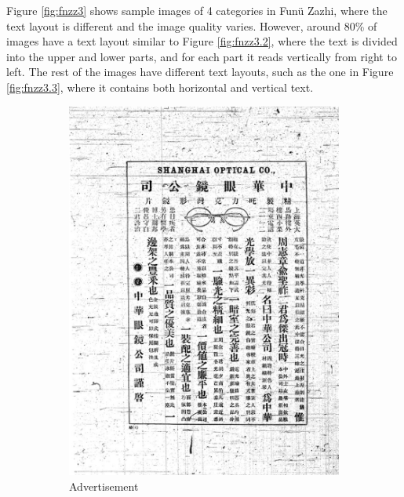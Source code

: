 \documentclass[12pt,twoside]{report}
\begin{document}
Figure \ref{fig:fnzz3} shows sample images of 4 categories in Funü Zazhi, where the text layout is different and the image quality varies. However, around 80\% of images have a text layout similar to Figure \ref{fig:fnzz3.2}, where the text is divided into the upper and lower parts, and for each part it reads vertically from right to left. The rest of the images have different text layouts, such as the one in Figure \ref{fig:fnzz3.3}, where it contains both horizontal and vertical text.

\begin{figure}[htbp]
    \centering
    \begin{subfigure}[b]{0.23\linewidth}
        \includegraphics[width=\linewidth]{./figures/fnzz3.1}
        \caption{Advertisement}
        \label{fig:fnzz3.1}
    \end{subfigure}
    \hfill
    \begin{subfigure}[b]{0.23\linewidth}

\end{subfigure}
\end{figure}
\end{document}
